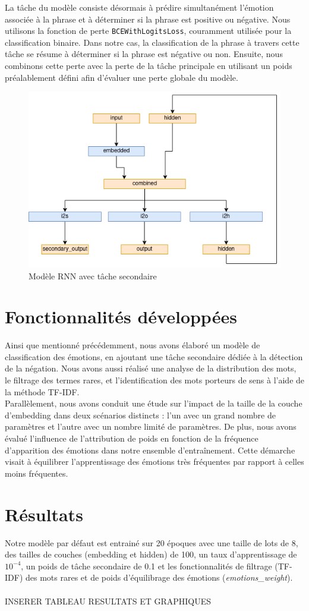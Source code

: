 \documentclass{article}
\begin{document}
La tâche du modèle consiste désormais à prédire simultanément l'émotion associée à la phrase et à déterminer si la phrase est positive ou négative. Nous utilisons la fonction de perte \texttt{BCEWithLogitsLoss}, couramment utilisée pour la classification binaire. Dans notre cas, la classification de la phrase à travers cette tâche se résume à déterminer si la phrase est négative ou non. Ensuite, nous combinons cette perte avec la perte de la tâche principale en utilisant un poids préalablement défini afin d'évaluer une perte globale du modèle.

\begin{figure}[H]
    \centering
    \includegraphics[width=0.5\linewidth]{img/modele_with_secondary.png}
    \caption{Modèle RNN avec tâche secondaire}

    \label{fig:modele_rnn_with_secondary}
\end{figure}

\section{Fonctionnalités développées}
Ainsi que mentionné précédemment, nous avons élaboré un modèle de classification des émotions, en ajoutant une tâche secondaire dédiée à la détection de la négation. Nous avons aussi réalisé une analyse de la distribution des mots, le filtrage des termes rares, et l'identification des mots porteurs de sens à l'aide de la méthode TF-IDF. \\
Parallèlement, nous avons conduit une étude sur l'impact de la taille de la couche d'embedding dans deux scénarios distincts : l'un avec un grand nombre de paramètres et l'autre avec un nombre limité de paramètres. De plus, nous avons évalué l'influence de l'attribution de poids en fonction de la fréquence d'apparition des émotions dans notre ensemble d'entraînement. Cette démarche visait à équilibrer l'apprentissage des émotions très fréquentes par rapport à celles moins fréquentes.

\section{Résultats}

Notre modèle par défaut est entrainé sur 20 époques avec une taille de lots de 8, des tailles de couches (embedding et hidden) de 100, un taux d'apprentissage de $10^{-4}$, un poids de tâche secondaire de 0.1 et les fonctionnalités de filtrage (TF-IDF) des mots rares et de poids d'équilibrage des émotions (\textit{emotions\_weight}).
\\\\
INSERER TABLEAU RESULTATS ET GRAPHIQUES
\end{document}
